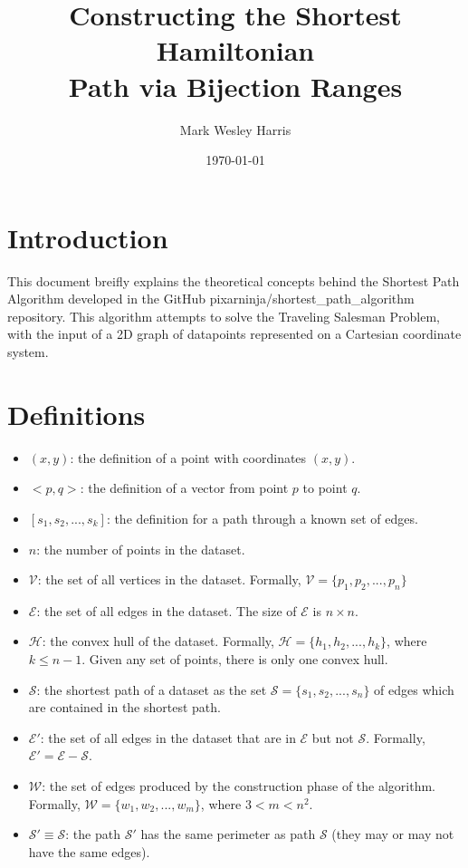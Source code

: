 \documentclass[12pt]{article}
\title{Constructing the Shortest Hamiltonian\\Path via Bijection Ranges}
\author{
Mark Wesley Harris
}
\date{\today}
\begin{document}
\maketitle

\section{Introduction}\label{sec:intro}
This document breifly explains the theoretical concepts behind the
Shortest Path Algorithm developed in the GitHub
pixarninja/shortest\_path\_algorithm repository. This algorithm attempts
to solve the Traveling Salesman Problem, with the input of a 2D graph of datapoints
represented on a Cartesian coordinate system.

\section{Definitions}\label{sec:def}
\begin{itemize}
\item $(x,y)$: the definition of a point with coordinates $(x,y)$.
\item $<p,q>$: the definition of a vector from point $p$ to point $q$.
\item $[s_1, s_2, ..., s_k]$: the definition for a path through a known set of edges.
\item $n$: the number of points in the dataset.
\item $\mathcal{V}$: the set of all vertices in the dataset.
Formally, $\mathcal{V} = \{p_1, p_2, ..., p_n\}$
\item $\mathcal{E}$: the set of all edges in the dataset.
The size of $\mathcal{E}$ is $n \times n$.
\item $\mathcal{H}$: the convex hull of the dataset.
Formally, $\mathcal{H} = \{h_1, h_2, ..., h_k\}$, where $k \leq n - 1$.
Given any set of points,
there is only one convex hull.
\item $\mathcal{S}$: the shortest path of a dataset as the set
$\mathcal{S} = \{s_1, s_2, ..., s_n\}$
of edges which are contained in the shortest path.
\item $\mathcal{E}'$: the set of all edges in the dataset that are in $\mathcal{E}$
but not $\mathcal{S}$.
Formally, $\mathcal{E}' = \mathcal{E} - \mathcal{S}$.
\item $\mathcal{W}$: the set of edges produced by the construction phase of the algorithm.
Formally, $\mathcal{W} = \{w_1, w_2, ..., w_m\}$, where $3 < m < n^2$.
\item $\mathcal{S}' \equiv \mathcal{S}$: the path $\mathcal{S}'$ has the same
perimeter as path $\mathcal{S}$
(they may or may not have the same edges).
\end{itemize}
\end{document}
